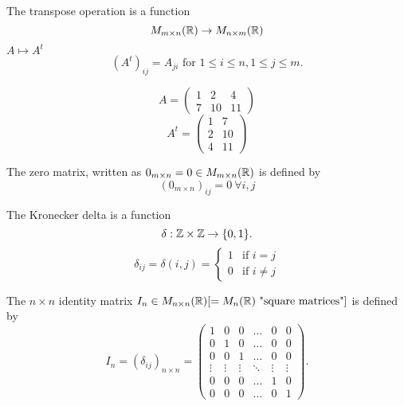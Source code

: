 \documentclass[10pt, a4paper]{article}
\begin{document}
The transpose operation is a function 
\[
M_{m \times n}(\mathbb{R}) \rightarrow M_{n \times m}(\mathbb{R})
\]
$A \mapsto A ^ t$
\[
(A ^ t)_{ij} = A_{ji}\text{ for } 1 \leq i \leq n, 1 \leq j \leq m.
\]

\begin{example}
    \[
    A = \begin{pmatrix}
        1 & 2 & 4 \\
        7 & 10 & 11
    \end{pmatrix}
    \]
    \[
    A ^ t = \begin{pmatrix}
        1 & 7 \\ 
        2 & 10 \\
        4 & 11
    \end{pmatrix}
    \]
\end{example}

\begin{definition}
    The zero matrix, written as $0_{m \times n} = 0 \in M_{m \times n}(\mathbb{R})$ is defined by
    \[
    (0_{m \times n})_{ij} = 0\ \forall i,j
    \]
\end{definition}

\begin{definition}
    The Kronecker delta is a function
    \[
    \delta : \mathbb{Z} \times \mathbb{Z} \rightarrow \{0, 1\}.
    \]
    \[
    \delta_{ij} = \delta(i, j) = \begin{cases}
        1 &\text{if } i = j \\
        0 &\text{if } i \neq j
    \end{cases}
    \]
\end{definition}

\begin{definition}
    The $n \times n$ identity matrix $I_n \in M_{n \times n}(\mathbb{R})[=M_n(\mathbb{R}) \text{ "square matrices"}]$ is defined by
    \[
    I_n = (\delta_{ij})_{n \times n} = \begin{pmatrix}
        1 & 0 & 0 & \dotsc & 0 & 0 \\
        0 & 1 & 0 & \dotsc & 0 & 0 \\
        0 & 0 & 1 & \dotsc & 0 & 0 \\
        \vdots & \vdots & \vdots & \ddots & \vdots & \vdots \\
        0 & 0 & 0 & \dotsc & 1 & 0 \\
        0 & 0 & 0 & \dotsc & 0 & 1
    \end{pmatrix}.
    \]
\end{definition}
\end{document}
